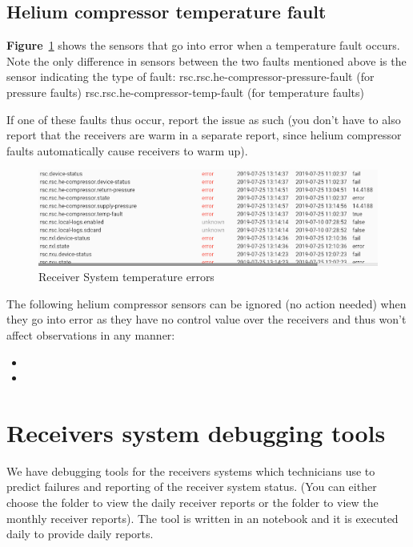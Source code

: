 \subsection{Helium compressor temperature fault}
\textbf{Figure}~\ref{fig:He2} shows the sensors that go into error when a temperature fault occurs.
Note the only difference in sensors between the two faults mentioned above is the sensor indicating the type of fault:
rsc.rsc.he-compressor-pressure-fault (for pressure faults)
rsc.rsc.he-compressor-temp-fault (for temperature faults)

If one of these faults thus occur, report the issue as such (you don’t have to also report that the receivers are warm in a separate report, since helium compressor faults automatically cause receivers to warm up).

\clearpage
\begin{figure}[!thb]
	\centering
	\includegraphics[scale=0.8]{Chapters/images/He2.png}
	
	\caption{Receiver System temperature errors}
	\label{fig:He2}
\end{figure}



The following helium compressor sensors can be ignored (no action needed) when they go into error as they have no control value over the receivers and thus won’t affect observations in any manner:
\begin{itemize}
	\item{} 
	\item{} 
\end{itemize}

\section{ Receivers system debugging tools}
We have debugging tools for the receivers systems which technicians use to predict failures and reporting of the receiver system status.  (You can either choose the folder to view the daily receiver reports or the folder to view the monthly receiver reports). The tool is written in an notebook and it is executed daily to provide daily reports. 

